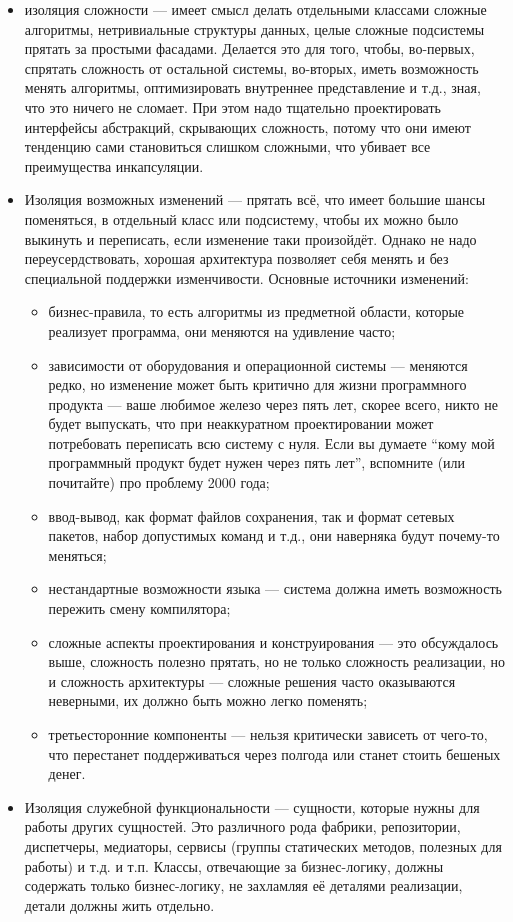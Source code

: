\documentclass{../../text-style}
\begin{document}
\begin{itemize}
	\item изоляция сложности --- имеет смысл делать отдельными классами сложные алгоритмы, нетривиальные структуры данных, целые сложные подсистемы прятать за простыми фасадами. Делается это для того, чтобы, во-первых, спрятать сложность от остальной системы, во-вторых, иметь возможность менять алгоритмы, оптимизировать внутреннее представление и т.д., зная, что это ничего не сломает. При этом надо тщательно проектировать интерфейсы абстракций, скрывающих сложность, потому что они имеют тенденцию сами становиться слишком сложными, что убивает все преимущества инкапсуляции.
	\item Изоляция возможных изменений --- прятать всё, что имеет большие шансы поменяться, в отдельный класс или подсистему, чтобы их можно было выкинуть и переписать, если изменение таки произойдёт. Однако не надо переусердствовать, хорошая архитектура позволяет себя менять и без специальной поддержки изменчивости. Основные источники изменений:
	\begin{itemize}
		\item бизнес-правила, то есть алгоритмы из предметной области, которые реализует программа, они меняются на удивление часто;
		\item зависимости от оборудования и операционной системы --- меняются редко, но изменение может быть критично для жизни программного продукта --- ваше любимое железо через пять лет, скорее всего, никто не будет выпускать, что при неаккуратном проектировании может потребовать переписать всю систему с нуля. Если вы думаете ``кому мой программный продукт будет нужен через пять лет'', вспомните (или почитайте) про проблему 2000 года;
		\item ввод-вывод, как формат файлов сохранения, так и формат сетевых пакетов, набор допустимых команд и т.д., они наверняка будут почему-то меняться;
		\item нестандартные возможности языка --- система должна иметь возможность пережить смену компилятора;
		\item сложные аспекты проектирования и конструирования --- это обсуждалось выше, сложность полезно прятать, но не только сложность реализации, но и сложность архитектуры --- сложные решения часто оказываются неверными, их должно быть можно легко поменять;
		\item третьесторонние компоненты --- нельзя критически зависеть от чего-то, что перестанет поддерживаться через полгода или станет стоить бешеных денег.
	\end{itemize}
	\item Изоляция служебной функциональности --- сущности, которые нужны для работы других сущностей. Это различного рода фабрики, репозитории, диспетчеры, медиаторы, сервисы (группы статических методов, полезных для работы) и т.д. и т.п. Классы, отвечающие за бизнес-логику, должны содержать только бизнес-логику, не захламляя её деталями реализации, детали должны жить отдельно.
\end{itemize}
\end{document}

